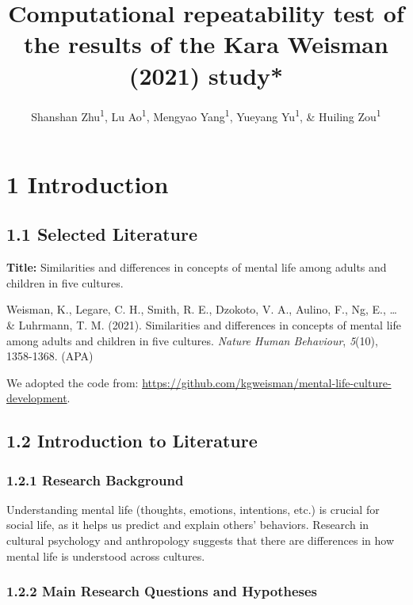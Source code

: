 \documentclass[
  man]{apa6}
\title{Computational repeatability test of the results of the Kara Weisman (2021) study*}
\author{Shanshan Zhu\textsuperscript{1}, Lu Ao\textsuperscript{1}, Mengyao Yang\textsuperscript{1}, Yueyang Yu\textsuperscript{1}, \& Huiling Zou\textsuperscript{1}}
\date{}
\affiliation{\vspace{0.5cm}\textsuperscript{1} Nanjing Normal University}
\begin{document}
\maketitle

\hypertarget{introduction}{%
\section{1 Introduction}\label{introduction}}

\hypertarget{selected-literature}{%
\subsection{1.1 Selected Literature}\label{selected-literature}}

\textbf{Title:} Similarities and differences in concepts of mental life among
adults and children in five cultures.

Weisman, K., Legare, C. H., Smith, R. E., Dzokoto, V. A., Aulino, F., Ng, E., \ldots{} \& Luhrmann, T. M. (2021). Similarities and differences in concepts of mental life among adults and children in five cultures. \emph{Nature Human Behaviour}, \emph{5}(10), 1358-1368. (APA)

We adopted the code from:
\url{https://github.com/kgweisman/mental-life-culture-development}.

\hypertarget{introduction-to-literature}{%
\subsection{1.2 Introduction to Literature}\label{introduction-to-literature}}

\hypertarget{research-background}{%
\subsubsection{1.2.1 Research Background}\label{research-background}}

Understanding mental life (thoughts, emotions, intentions, etc.) is crucial for social life, as it helps us predict and explain others' behaviors. Research in cultural psychology and anthropology suggests that there are differences in how mental life is understood across cultures.

\hypertarget{main-research-questions-and-hypotheses}{%
\subsubsection{1.2.2 Main Research Questions and Hypotheses}\label{main-research-questions-and-hypotheses}}
\end{document}
